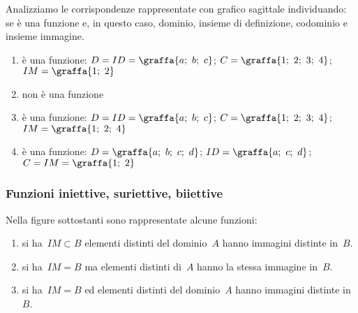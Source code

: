 \begin{esempio}
\label{ex:D.1}
Analizziamo le corrispondenze rappresentate con grafico sagittale 
individuando: se è una funzione e, in questo caso, dominio, insieme di 
definizione, codominio e insieme immagine.
 \begin{center}
  
 \end{center}

\begin{enumerate} [nosep, label=\alph*)]
\item è una funzione: 
\(D=ID=\graffa{a;~b;~c}\); \quad 
\(C=\graffa{1;~2;~3;~4}\); \quad
\(IM=\graffa{1;~2}\)
\item non è una funzione
\item è una funzione: 
\(D=ID=\graffa{a;~b;~c}\); \quad 
\(C=\graffa{1;~2;~3;~4}\); \quad
\(IM=\graffa{1;~2;~4}\)
\item è una funzione: 
\(D=\graffa{a;~b;~c;~d}\); \quad 
\(ID=\graffa{a;~c;~d}\); \quad 
\(C=IM=\graffa{1;~2}\) 
\end{enumerate}
\end{esempio}



\subsubsection{Funzioni iniettive, suriettive, biiettive}

 \begin{esempio}
Nella figure sottostanti sono rappresentate alcune funzioni:
\begin{center}
 
\end{center}

\begin{enumerate} [nosep, label=\alph*)]
\item si ha~\(IM \subset B\) elementi distinti del dominio~\(A\) 
hanno immagini distinte in~\(B\).
\item si ha~\(IM=B\) ma elementi distinti di~\(A\) hanno la 
stessa immagine in~\(B\).
\item si ha~\(IM=B\) ed elementi distinti del dominio~\(A\) 
hanno immagini distinte in~\(B\).
\end{enumerate}
\end{esempio}

